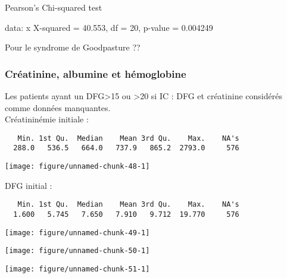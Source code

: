 \documentclass[11pt,a4paper]{article}\usepackage[]{graphicx}\usepackage[]{color}
\makeatletter
\def\maxwidth{ %
  \ifdim\Gin@nat@width>\linewidth
    \linewidth
  \else
    \Gin@nat@width
  \fi
}
\newenvironment{kframe}{%
 \def\at@end@of@kframe{}%
 \ifinner\ifhmode%
  \def\at@end@of@kframe{\end{minipage}}%
  \begin{minipage}{\columnwidth}%
 \fi\fi%
 \def\FrameCommand##1{\hskip\@totalleftmargin \hskip-\fboxsep
 \colorbox{shadecolor}{##1}\hskip-\fboxsep
     \hskip-\linewidth \hskip-\@totalleftmargin \hskip\columnwidth}%
 \MakeFramed {\advance\hsize-\width
   \@totalleftmargin\z@ \linewidth\hsize
   \@setminipage}}%
 {\par\unskip\endMakeFramed%
 \at@end@of@kframe}
\newenvironment{knitrout}{}{} %
\makeatother
\begin{document}
	Pearson's Chi-squared test

data:  x
X-squared = 40.553, df = 20, p-value = 0.004249



Pour le syndrome de Goodpasture ??


    \subsubsection{Créatinine, albumine et hémoglobine}

Les patients ayant un DFG\textgreater15 ou \textgreater20 si IC : DFG et créatinine considérés comme données manquantes.
~\\

Créatininémie initiale :

\begin{knitrout}
\color{fgcolor}\begin{kframe}
\begin{verbatim}
   Min. 1st Qu.  Median    Mean 3rd Qu.    Max.    NA's 
  288.0   536.5   664.0   737.9   865.2  2793.0     576 
\end{verbatim}
\end{kframe}
\texttt{[image: figure/unnamed-chunk-48-1]} 

\end{knitrout}

DFG initial :

\begin{knitrout}
\color{fgcolor}\begin{kframe}
\begin{verbatim}
   Min. 1st Qu.  Median    Mean 3rd Qu.    Max.    NA's 
  1.600   5.745   7.650   7.910   9.712  19.770     576 
\end{verbatim}
\end{kframe}
\texttt{[image: figure/unnamed-chunk-49-1]} 

\end{knitrout}

\begin{knitrout}
\color{fgcolor}
\texttt{[image: figure/unnamed-chunk-50-1]} 

\end{knitrout}

\begin{knitrout}
\color{fgcolor}
\texttt{[image: figure/unnamed-chunk-51-1]} 

\end{knitrout}
\end{document}
